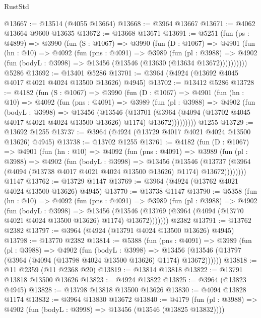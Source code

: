 \begin{lexlean}{RustStd}
\begin{coremodule}
{\begin{coremodule}
{{{{{{{{{{{{{{{{{{{{{{{{{{{{{{{{{{{{{{@13667 := @13514 (@4055 @13664)
@13668 := @3964 @13667
@13671 := @4062 @13664 @9600 @13635
@13672 := @13668 @13671
@13691 := @5251
    (fun (ps : @4899) =>
    @3990
      (fun (S : @1067) =>
      @3990
        (fun (D : @1067) =>
        @4901
          (fun (hn : @10) =>
          @4092
            (fun (pns : @4091) =>
            @3989
              (fun (pl : @3988) =>
              @4902 (fun (bodyL : @3998) => @13456 (@13546 (@13630 (@13634 @13672))))))))))
    @5286
@13692 := @13401 @5286
@13701 := @3964 (@4924 (@13692 @4045 @4017 @4021 @4024 @13500 @13626) @4945)
@13702 := @13412 @5286
@13728 := @4182
    (fun (S : @1067) =>
    @3990
      (fun (D : @1067) =>
      @4901
        (fun (hn : @10) =>
        @4092
          (fun (pns : @4091) =>
          @3989
            (fun (pl : @3988) =>
            @4902
              (fun (bodyL : @3998) =>
              @13456
                (@13546
                  (@13701
                    (@3964
                      (@4094 (@13702 @4045 @4017 @4021 @4024 @13500 @13626) @1174)
                      @13672)))))))))
    @1255
@13729 := @13692 @1255
@13737 := @3964 (@4924 (@13729 @4017 @4021 @4024 @13500 @13626) @4945)
@13738 := @13702 @1255
@13761 := @4182
    (fun (D : @1067) =>
    @4901
      (fun (hn : @10) =>
      @4092
        (fun (pns : @4091) =>
        @3989
          (fun (pl : @3988) =>
          @4902
            (fun (bodyL : @3998) =>
            @13456
              (@13546
                (@13737 (@3964 (@4094 (@13738 @4017 @4021 @4024 @13500 @13626) @1174) @13672))))))))
    @1147
@13762 := @13729 @1147
@13769 := @3964 (@4924 (@13762 @4021 @4024 @13500 @13626) @4945)
@13770 := @13738 @1147
@13790 := @5358
    (fun (hn : @10) =>
    @4092
      (fun (pns : @4091) =>
      @3989
        (fun (pl : @3988) =>
        @4902
          (fun (bodyL : @3998) =>
          @13456
            (@13546 (@13769 (@3964 (@4094 (@13770 @4021 @4024 @13500 @13626) @1174) @13672)))))))
    @2382
@13791 := @13762 @2382
@13797 := @3964 (@4924 (@13791 @4024 @13500 @13626) @4945)
@13798 := @13770 @2382
@13814 := @5388
    (fun (pns : @4091) =>
    @3989
      (fun (pl : @3988) =>
      @4902
        (fun (bodyL : @3998) =>
        @13456 (@13546 (@13797 (@3964 (@4094 (@13798 @4024 @13500 @13626) @1174) @13672))))))
@13818 := @11 @2359 (@11 @2368 @20)
@13819 := @13814 @13818
@13822 := @13791 @13818 @13500 @13626
@13823 := @4924 @13822
@13825 := @3964 (@13823 @4945)
@13828 := @13798 @13818 @13500 @13626
@13830 := @4094 @13828 @1174
@13832 := @3964 @13830 @13672
@13840 := @4179
    (fun (pl : @3988) => @4902 (fun (bodyL : @3998) => @13456 (@13546 (@13825 @13832))))
}}}}}}}}}}}}}}}}}}}}}}}}}}}}}}}}}}}}}}
\end{coremodule}}
\end{coremodule}
\end{lexlean}
